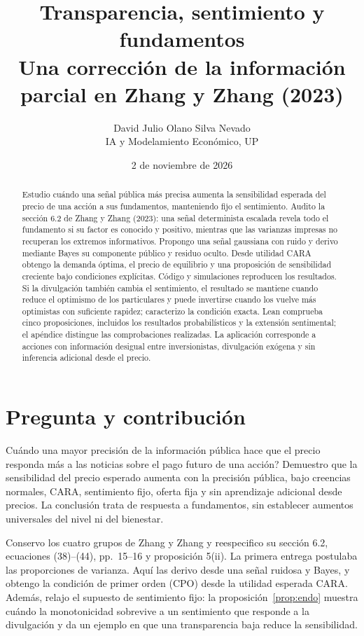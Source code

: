 \documentclass[11pt]{article}
\title{Transparencia, sentimiento y fundamentos\\
\large Una corrección de la información parcial en Zhang y Zhang (2023)}
\author{David Julio Olano Silva Nevado\\IA y Modelamiento Económico, UP}
\date{2 de noviembre de 2026}
\begin{document}
\maketitle
\begin{abstract}
\noindent Estudio cuándo una señal pública más precisa aumenta la sensibilidad
esperada del precio de una acción a sus fundamentos, manteniendo fijo el
sentimiento. Audito la sección 6.2 de Zhang y Zhang (2023): una señal
determinista escalada revela todo el fundamento si su factor es conocido y
positivo, mientras que las varianzas impresas no recuperan los extremos
informativos. Propongo una señal gaussiana con ruido y derivo mediante Bayes
su componente público y residuo oculto. Desde utilidad CARA obtengo la
demanda óptima, el precio de equilibrio y una proposición de sensibilidad
creciente bajo condiciones explícitas. Código y simulaciones reproducen los
resultados. Si la divulgación también cambia el sentimiento, el resultado
se mantiene cuando reduce el optimismo de los particulares y puede invertirse cuando los
vuelve más optimistas con suficiente rapidez; caracterizo la condición exacta.
Lean comprueba cinco proposiciones, incluidos los resultados probabilísticos
y la extensión sentimental; el apéndice distingue las comprobaciones realizadas.
La aplicación corresponde a acciones con
información desigual entre inversionistas, divulgación exógena y sin
inferencia adicional desde el precio.
\end{abstract}

\section{Pregunta y contribución}
\textquestiondown{}Cuándo una mayor precisión de la información pública hace
que el precio responda más a las noticias sobre el pago futuro de una acción?
Demuestro que la sensibilidad del precio esperado aumenta con la precisión
pública, bajo creencias normales, CARA, sentimiento fijo, oferta fija y sin
aprendizaje adicional desde precios. La conclusión trata de respuesta a
fundamentos, sin establecer aumentos universales del nivel ni del bienestar.

Conservo los cuatro grupos de Zhang y Zhang \cite{zhang2023} y reespecifico
su sección 6.2, ecuaciones (38)--(44), pp.~15--16 y proposición 5(ii).
La primera entrega postulaba las proporciones de varianza. Aquí las derivo
desde una señal ruidosa y Bayes, y obtengo la condición de primer orden
(CPO) desde la utilidad esperada CARA. Además, relajo el supuesto de
sentimiento fijo: la proposición~\ref{prop:endo} muestra cuándo la
monotonicidad sobrevive a un sentimiento que responde a la divulgación y
da un ejemplo en que una transparencia baja reduce la sensibilidad.
\end{document}
